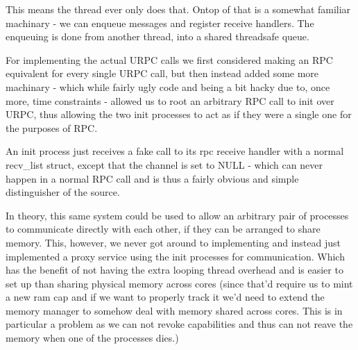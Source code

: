 This means the thread ever only does that. Ontop of that is a somewhat 
familiar machinary - we can enqueue messages and register receive handlers. 
The enqueuing is done from another thread, into a shared threadsafe queue.
\medskip

For implementing the actual URPC calls we first considered making an RPC 
equivalent for every single URPC call, but then instead added some more 
machinary - which while fairly ugly code and being a bit hacky due to, once 
more, time constraints - allowed us to root an arbitrary RPC call to init over 
URPC, thus allowing the two init processes to act as if they were a single one 
for the purposes of RPC.
\medskip

An init process just receives a fake call to its rpc receive handler with a 
normal recv\_list struct, except that the channel is set to NULL - which can 
never happen in a normal RPC call and is thus a fairly obvious and simple 
distinguisher of the source.
\medskip

In theory, this same system could be used to allow an arbitrary pair of 
processes to communicate directly with each other, if they can be arranged to 
share memory. This, however, we never got around to implementing and instead 
just implemented a proxy service using the init processes for communication. 
Which has the benefit of not having the extra looping thread overhead and is 
easier to set up than sharing physical memory across cores (since that'd 
require us to mint a new ram cap and if we want to properly track it we'd 
need to extend the memory manager to somehow deal with memory shared across 
cores. This is in particular a problem as we can not revoke capabilities and 
thus can not reave the memory when one of the processes dies.)
